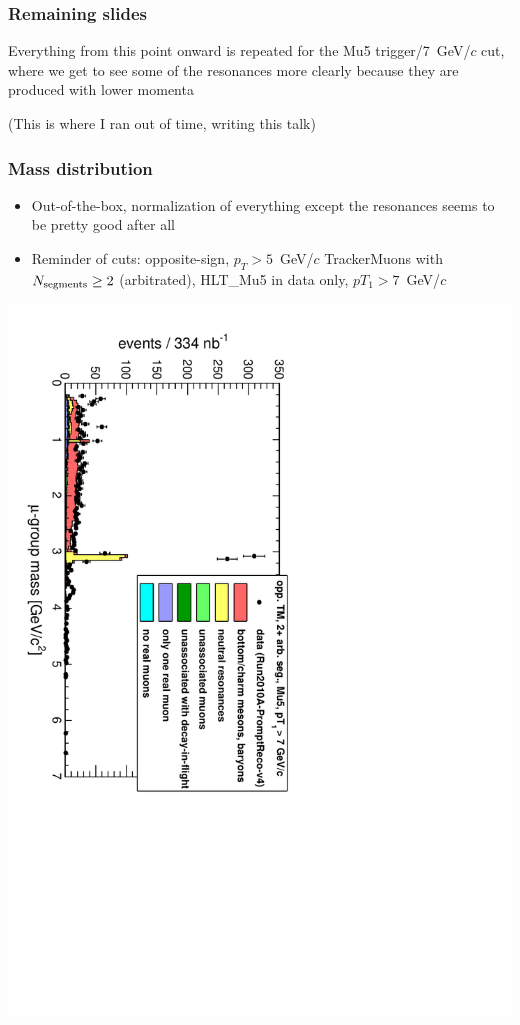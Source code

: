 \documentclass[compress]{beamer}
\newcommand{\s}[1]{{\mbox{\scriptsize #1}}}
\begin{document}
\begin{frame}
\frametitle{Remaining slides} Everything from this point onward is
repeated for the Mu5 trigger/7~GeV/$c$ cut, where we get to see some
of the resonances more clearly because they are produced with lower
momenta

\vspace{1 cm}
(This is where I ran out of time, writing this talk)
\end{frame}

\begin{frame}
\frametitle{Mass distribution}
\begin{itemize}
\item Out-of-the-box, normalization of everything except the
resonances seems to be pretty good after all
\item Reminder of cuts: opposite-sign, $p_T > 5$~GeV/$c$ TrackerMuons with $N_\s{segments} \ge 2$ (arbitrated), HLT\_Mu5 in data only, $pT_1 > 7$~GeV/$c$
\end{itemize}

\vfill
\includegraphics[height=\linewidth, angle=90]{Mu5_mass_general.pdf}
\end{frame}
\end{document}

